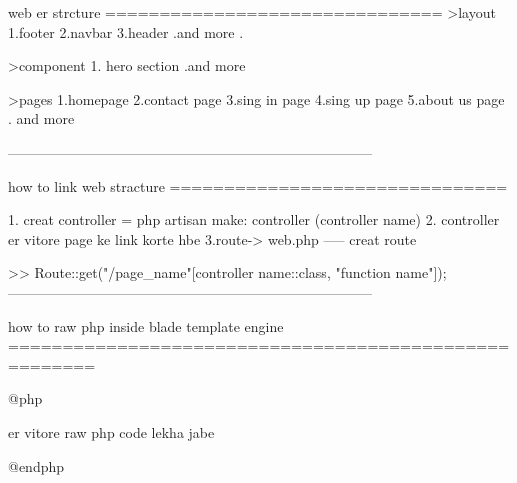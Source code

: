 
web er strcture
===============================
>layout
  1.footer
  2.navbar
  3.header
  .and more
  .

>component
 1. hero section
 .and more

>pages
 1.homepage
 2.contact page
 3.sing in page
 4.sing up page
 5.about us page
 . and more

------------------------------------------------------------------------------

how to link  web stracture
===============================

1. creat controller  =  php artisan make: controller (controller name)
2. controller er vitore page ke link korte hbe
3.route-> web.php ----- creat route

 >> Route::get("/page_name"[controller name::class, "function name"]);
------------------------------------------------------------------------------

 how to raw php inside blade template engine
 ======================================================

@php

 er vitore raw php code lekha jabe

@endphp

